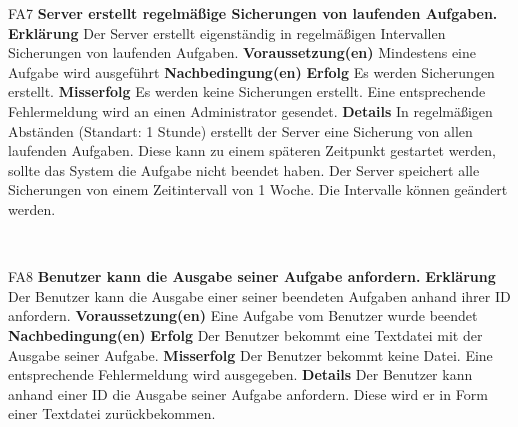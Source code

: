 \documentclass[a4paper,12pt]{article}
\begin{document}
\begin{itemize}[nosep]
	\begin{minipage}[t]{\linewidth}
		\item[FA7] \textbf{\gls{Server} erstellt regelmäßige Sicherungen von laufenden Aufgaben.}
		\subitem \textbf{Erklärung} Der \gls{Server} erstellt eigenständig in regelmäßigen Intervallen Sicherungen von laufenden Aufgaben.
		\subitem \textbf{Voraussetzung(en)} Mindestens eine Aufgabe wird ausgeführt
		\subitem \textbf{Nachbedingung(en)}
		\subsubitem \textbf{Erfolg} Es werden Sicherungen erstellt.
		\subsubitem \textbf{Misserfolg} Es werden keine Sicherungen erstellt. Eine entsprechende Fehlermeldung wird an einen \gls{Administrator} gesendet.
		\subitem \textbf{Details} In regelmäßigen Abständen (Standart: 1 Stunde) erstellt der Server eine Sicherung von allen laufenden Aufgaben. Diese kann zu einem späteren Zeitpunkt gestartet werden, sollte das System die Aufgabe nicht beendet haben. Der Server speichert alle Sicherungen von einem Zeitintervall von 1 Woche. Die Intervalle können geändert werden.
	\end{minipage}	
	\newline
	\\
	
	\begin{minipage}[t]{\linewidth}
		\item[FA8] \textbf{\gls{Benutzer} kann die Ausgabe seiner Aufgabe anfordern.}
		\subitem \textbf{Erklärung} Der \gls{Benutzer} kann die Ausgabe einer seiner beendeten Aufgaben anhand ihrer ID anfordern.
		\subitem \textbf{Voraussetzung(en)} Eine Aufgabe vom \gls{Benutzer} wurde beendet
		\subitem \textbf{Nachbedingung(en)}
		\subsubitem \textbf{Erfolg} Der Benutzer bekommt eine Textdatei mit der Ausgabe seiner Aufgabe.
		\subsubitem \textbf{Misserfolg} Der Benutzer bekommt keine Datei. Eine entsprechende Fehlermeldung wird ausgegeben.
		\subitem \textbf{Details} Der \gls{Benutzer} kann anhand einer ID die Ausgabe seiner Aufgabe anfordern. Diese wird er in Form einer Textdatei zurückbekommen.
	\end{minipage}	
	\newline
	\\
	
\end{itemize}


\end{document}
